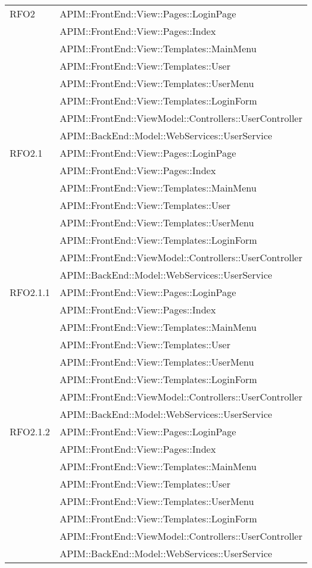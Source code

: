 \begin{longtable}{ p{4cm} | p{12cm} }
		    \hline RFO2
		    & APIM::FrontEnd::View::Pages::LoginPage \\
		    & APIM::FrontEnd::View::Pages::Index \\
		    & APIM::FrontEnd::View::Templates::MainMenu \\
		    & APIM::FrontEnd::View::Templates::User \\
		    & APIM::FrontEnd::View::Templates::UserMenu \\
		    & APIM::FrontEnd::View::Templates::LoginForm \\
			& APIM::FrontEnd::ViewModel::Controllers::UserController \\
			& APIM::BackEnd::Model::WebServices::UserService \\
		    
		    \hline RFO2.1
		    & APIM::FrontEnd::View::Pages::LoginPage \\
		    & APIM::FrontEnd::View::Pages::Index \\
		    & APIM::FrontEnd::View::Templates::MainMenu \\
		    & APIM::FrontEnd::View::Templates::User \\
		    & APIM::FrontEnd::View::Templates::UserMenu \\
		    & APIM::FrontEnd::View::Templates::LoginForm \\
			& APIM::FrontEnd::ViewModel::Controllers::UserController \\
			& APIM::BackEnd::Model::WebServices::UserService \\
		    
		    \hline RFO2.1.1
		    & APIM::FrontEnd::View::Pages::LoginPage \\
		    & APIM::FrontEnd::View::Pages::Index \\
		    & APIM::FrontEnd::View::Templates::MainMenu \\
		    & APIM::FrontEnd::View::Templates::User \\
		    & APIM::FrontEnd::View::Templates::UserMenu \\
		    & APIM::FrontEnd::View::Templates::LoginForm \\
			& APIM::FrontEnd::ViewModel::Controllers::UserController \\
			& APIM::BackEnd::Model::WebServices::UserService \\
			
		    \hline RFO2.1.2
		    & APIM::FrontEnd::View::Pages::LoginPage \\
		    & APIM::FrontEnd::View::Pages::Index \\
		    & APIM::FrontEnd::View::Templates::MainMenu \\
		    & APIM::FrontEnd::View::Templates::User \\
		    & APIM::FrontEnd::View::Templates::UserMenu \\
		    & APIM::FrontEnd::View::Templates::LoginForm \\
			& APIM::FrontEnd::ViewModel::Controllers::UserController \\
			& APIM::BackEnd::Model::WebServices::UserService \\
			

\end{longtable}
